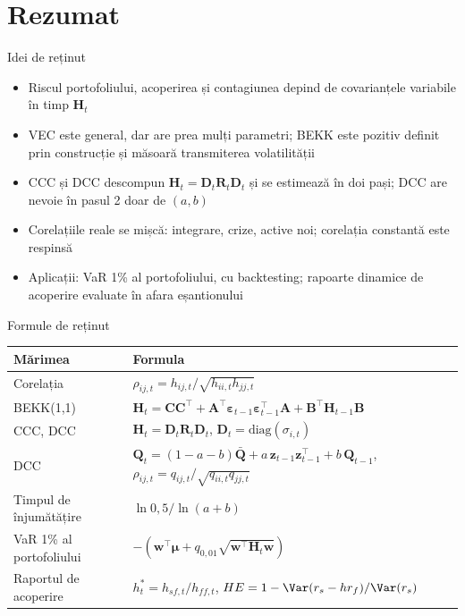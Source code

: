 \section{Rezumat}

\begin{frame}{Idei de reținut}
\itemsize{\small}
\begin{itemize}
    \item Riscul portofoliului, acoperirea și contagiunea depind de covarianțele variabile în timp $\mathbf{H}_t$
    \item VEC este general, dar are prea mulți parametri; BEKK este pozitiv definit prin construcție și măsoară transmiterea volatilității
    \item CCC și DCC descompun $\mathbf{H}_t = \mathbf{D}_t\mathbf{R}_t\mathbf{D}_t$ și se estimează în doi pași; DCC are nevoie în pasul 2 doar de $(a, b)$
    \item Corelațiile reale se mișcă: integrare, crize, active noi; corelația constantă este respinsă
    \item Aplicații: VaR 1\% al portofoliului, cu backtesting; rapoarte dinamice de acoperire evaluate în afara eșantionului
\end{itemize}
\end{frame}

\begin{frame}{Formule de reținut}
\itemsize{\small}
{\renewcommand{\arraystretch}{1.35}\begin{center}
\footnotesize
\begin{tabular}{ll}
\toprule
\textbf{Mărimea} & \textbf{Formula} \\
\midrule
Corelația & $\rho_{ij,t} = h_{ij,t}/\sqrt{h_{ii,t}h_{jj,t}}$ \\
BEKK(1,1) & $\mathbf{H}_t = \mathbf{C}\mathbf{C}^\top + \mathbf{A}^\top\boldsymbol{\varepsilon}_{t-1}\boldsymbol{\varepsilon}_{t-1}^\top\mathbf{A} + \mathbf{B}^\top\mathbf{H}_{t-1}\mathbf{B}$ \\
CCC, DCC & $\mathbf{H}_t = \mathbf{D}_t\mathbf{R}_t\mathbf{D}_t$, \quad $\mathbf{D}_t = \mathrm{diag}(\sigma_{i,t})$ \\
DCC & $\mathbf{Q}_t = (1 - a - b)\bar{\mathbf{Q}} + a\,\mathbf{z}_{t-1}\mathbf{z}_{t-1}^\top + b\,\mathbf{Q}_{t-1}$, \quad $\rho_{ij,t} = q_{ij,t}/\sqrt{q_{ii,t}q_{jj,t}}$ \\
Timpul de înjumătățire & $\ln 0{,}5/\ln(a + b)$ \\
VaR 1\% al portofoliului & $-(\mathbf{w}^\top\boldsymbol{\mu} + q_{0{,}01}\sqrt{\mathbf{w}^\top\mathbf{H}_t\mathbf{w}})$ \\
Raportul de acoperire & $h_t^* = h_{sf,t}/h_{ff,t}$, \quad $HE = 1 - \Var(r_s - h r_f)/\Var(r_s)$ \\
\bottomrule
\end{tabular}
\end{center}
}
\end{frame}

